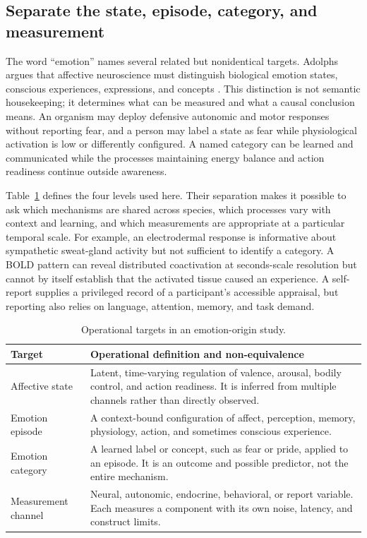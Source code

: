 \documentclass[conference]{IEEEtran}
\begin{document}
\subsection{Separate the state, episode, category, and measurement}

The word ``emotion'' names several related but nonidentical targets. Adolphs argues that affective neuroscience must distinguish biological emotion states, conscious experiences, expressions, and concepts \cite{Adolphs2016}. This distinction is not semantic housekeeping; it determines what can be measured and what a causal conclusion means. An organism may deploy defensive autonomic and motor responses without reporting fear, and a person may label a state as fear while physiological activation is low or differently configured. A named category can be learned and communicated while the processes maintaining energy balance and action readiness continue outside awareness.

Table~\ref{tab:targets} defines the four levels used here. Their separation makes it possible to ask which mechanisms are shared across species, which processes vary with context and learning, and which measurements are appropriate at a particular temporal scale. For example, an electrodermal response is informative about sympathetic sweat-gland activity but not sufficient to identify a category. A BOLD pattern can reveal distributed coactivation at seconds-scale resolution but cannot by itself establish that the activated tissue caused an experience. A self-report supplies a privileged record of a participant's accessible appraisal, but reporting also relies on language, attention, memory, and task demand.

\begin{table}[!t]
\caption{Operational targets in an emotion-origin study.}\label{tab:targets}
\centering
\footnotesize
\begin{tabular}{p{}p{}}
\toprule
Target & Operational definition and non-equivalence \\
\midrule
Affective state & Latent, time-varying regulation of valence, arousal, bodily control, and action readiness. It is inferred from multiple channels rather than directly observed. \\
Emotion episode & A context-bound configuration of affect, perception, memory, physiology, action, and sometimes conscious experience. \\
Emotion category & A learned label or concept, such as fear or pride, applied to an episode. It is an outcome and possible predictor, not the entire mechanism. \\
Measurement channel & Neural, autonomic, endocrine, behavioral, or report variable. Each measures a component with its own noise, latency, and construct limits. \\
\bottomrule
\end{tabular}
\end{table}
\end{document}
